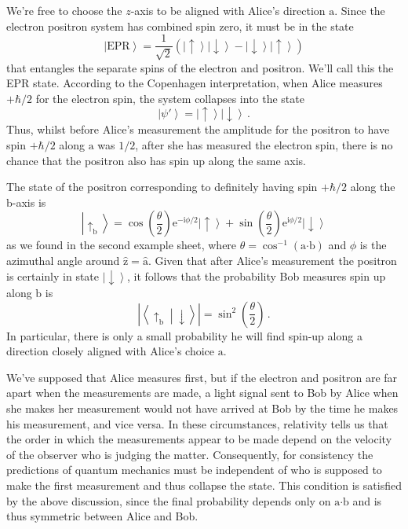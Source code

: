\documentclass{article}
\theoremstyle{plain}\theoremheaderfont{\normalfont\itshape}\theorembodyfont{\rmfamily}\theoremseparator{.}\newtheorem*{rem}{Remark}\newtheorem*{ex}{Example}\newtheorem*{proof}{Proof}\newtheorem*{altp}{Alternative proof}
\theoremstyle{plain}\theoremheaderfont{\normalfont\bfseries}\theorembodyfont{\rmfamily}\theoremseparator{.}\newtheorem{thm}{Theorem}[section]\newtheorem{lem}[thm]{Lemma}\newtheorem{prop}[thm]{Proposition}\newtheorem*{cor}{Corollary}\newtheorem{defn}[thm]{Definition}\newtheorem{clm}[thm]{Claim}\newtheorem{clminproof}{Claim}
\theoremstyle{break}\theoremheaderfont{\normalfont\itshape}\theorembodyfont{\rmfamily}\theoremseparator{.\medskip}\newtheorem*{proofskip}{Proof}\newtheorem*{exs}{Examples}\newtheorem*{rems}{Remarks}
\theoremstyle{break}\theoremheaderfont{\normalfont\bfseries}\theorembodyfont{\rmfamily}\theoremseparator{.\medskip}\newtheorem{lemskip}[thm]{Lemma}\newtheorem{defnskip}[thm]{Definition}\newtheorem{propskip}[thm]{Proposition}\newtheorem{thmskip}[thm]{Theorem}
\numberwithin{equation}{section}
\newcommand{\ii}{\mathrm{i}}
\newcommand{\ee}{\mathrm{e}}
\newcommand{\ket}[1]{\left| #1 \right\rangle}
\newcommand{\braket}[2]{\left\langle #1 \middle| #2 \right\rangle}
\newcommand{\vb}[1]{\bm{\mathrm{#1}}}
\newcommand{\vu}[1]{\hat{\bm{\mathrm{#1}}}}
\newcommand{\vdot}{\bm{\cdot}}
\newcommand{\abs}[1]{\left| #1 \right|}
\begin{document}
    We're free to choose the \(z\)-axis to be aligned with Alice's direction \(\vb{a}\). Since the electron positron system has combined spin zero, it must be in the state
    \begin{equation}\label{EPR_state}
        \ket{\text{EPR}}=\frac{1}{\sqrt{2}}\left(\ket{\uparrow}\ket{\downarrow}-\ket{\downarrow}\ket{\uparrow}\right)
    \end{equation}
    that entangles the separate spins of the electron and positron. We'll call this the EPR state. According to the Copenhagen interpretation, when Alice measures \(+\hbar/2\) for the electron spin, the system collapses into the state
    \begin{equation}
        \ket{\psi'}=\ket{\uparrow}\ket{\downarrow}\,.
    \end{equation}
    Thus, whilst before Alice's measurement the amplitude for the positron to have spin \(+\hbar/2\) along \(\vb{a}\) was \(1/2\), after she has measured the electron spin, there is no chance that the positron also has spin up along the same axis.

    The state of the positron corresponding to definitely having spin \(+\hbar/2\) along the \(\vb{b}\)-axis is
    \begin{equation}
        \ket{\uparrow_{\vb{b}}}=\cos\left(\frac{\theta}{2}\right)\ee^{-\ii \phi/2}\ket{\uparrow}+\sin\left(\frac{\theta}{2}\right)\ee^{\ii \phi/2}\ket{\downarrow}
    \end{equation}
    as we found in the second example sheet, where \(\theta=\cos^{-1}(\vb{a}\vdot\vb{b})\) and \(\phi\) is the azimuthal angle around \(\vu{z}=\vu{a}\). Given that after Alice's measurement the positron is certainly in state \(\ket{\downarrow}\), it follows that the probability Bob measures spin up along \(\vb{b}\) is
    \begin{equation}
        \abs{\braket{\uparrow_{\vb{b}}}{\downarrow}}=\sin^2\left(\frac{\theta}{2}\right)\,.
    \end{equation}
    In particular, there is only a small probability he will find spin-up along a direction closely aligned with Alice's choice \(\vb{a}\).

    We've supposed that Alice measures first, but if the electron and positron are far apart when the measurements are made, a light signal sent to Bob by Alice when she makes her measurement would not have arrived at Bob by the time he makes his measurement, and vice versa. In these circumstances, relativity tells us that the order in which the measurements appear to be made depend on the velocity of the observer who is judging the matter. Consequently, for consistency the predictions of quantum mechanics must be independent of who is supposed to make the first measurement and thus collapse the state. This condition is satisfied by the above discussion, since the final probability depends only on \(\vb{a}\vdot\vb{b}\) and is thus symmetric between Alice and Bob.
\end{document}
